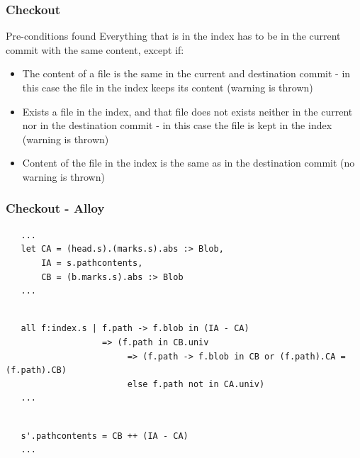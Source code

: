 \documentclass{beamer}
\begin{document}
\begin{frame}
   \frametitle{Checkout}
   \begin{block}{Pre-conditions found}
      Everything that is in the index has to be in the current commit with the
      same content, except if:
      \begin{itemize}
         \item The content of a file is the same in the
         current and destination commit - in this case
         the file in the index keeps its content (warning is thrown)
         \item Exists a file in the index, and that file does not exists
         neither in the current nor in the destination commit - in
         this case the file is kept in the index (warning is thrown)
         \item Content of the file in the index is the same as in the
         destination commit (no warning is thrown)
      \end{itemize}
   \end{block}
\end{frame}

\begin{frame}[fragile]
   \frametitle{Checkout - Alloy}
	\tiny
	\begin{lstlisting}
   ...
   let CA = (head.s).(marks.s).abs :> Blob, 
       IA = s.pathcontents,
       CB = (b.marks.s).abs :> Blob
   ...
	\end{lstlisting}
   \pause
	\begin{lstlisting}
   
   all f:index.s | f.path -> f.blob in (IA - CA) 
                   => (f.path in CB.univ 
                        => (f.path -> f.blob in CB or (f.path).CA = (f.path).CB)
                        else f.path not in CA.univ)
   ...
	\end{lstlisting}
   \pause
	\begin{lstlisting}
   
   s'.pathcontents = CB ++ (IA - CA)
   ...
   \end{lstlisting}
\end{frame}
\end{document}
